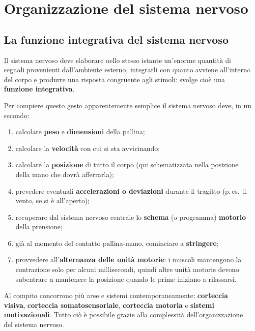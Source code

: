 \chapter{Organizzazione del sistema nervoso}

\section{La funzione integrativa del sistema nervoso}

Il sistema nervoso deve elaborare nello stesso istante un'enorme quantità di segnali
provenienti dall'ambiente esterno, integrarli con quanto avviene all'interno del corpo e
produrre una risposta congruente agli stimoli: svolge cioè una \textbf{funzione integrativa}.

Per compiere questo gesto apparentemente semplice il sistema nervoso deve, in un secondo:
\begin{enumerate}
  \item calcolare \textbf{peso} e \textbf{dimensioni} della pallina;
  \item calcolare la \textbf{velocità} con cui si sta avvicinando;
  \item calcolare la \textbf{posizione} di tutto il corpo (qui schematizzata nella posizione
    della mano che dovrà afferrarla);
  \item prevedere eventuali \textbf{accelerazioni o deviazioni} durante il tragitto
    (p.\,es.\ il vento, se si è all'aperto);
  \item recuperare dal sistema nervoso centrale lo \textbf{schema} (o programma)
    \textbf{motorio} della prensione;
  \item già al momento del contatto pallina-mano, cominciare a \textbf{stringere};
  \item provvedere all'\textbf{alternanza delle unità motorie}: i muscoli mantengono la
    contrazione solo per alcuni millisecondi, quindi altre unità motorie devono subentrare a
    mantenere la posizione quando le prime iniziano a rilassarsi.
\end{enumerate}

Al compito concorrono più aree e sistemi contemporaneamente: \textbf{corteccia visiva},
\textbf{corteccia somatosensoriale}, \textbf{corteccia motoria} e \textbf{sistemi
motivazionali}. Tutto ciò è possibile grazie alla complessità dell'organizzazione del sistema
nervoso.

